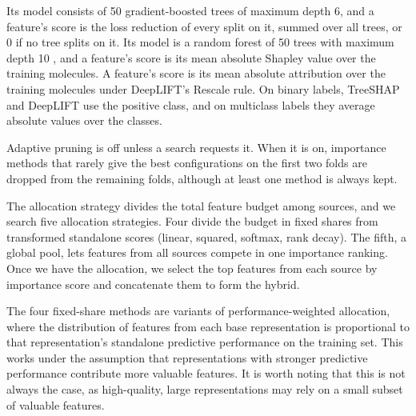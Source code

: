 Its model consists of 50 gradient-boosted trees of maximum depth 6, and a feature's score is the loss reduction of every split on it, summed over all trees, or 0 if no tree splits on it.
Its model is a random forest of 50 trees with maximum depth 10 \citep{Breiman2001}, and a feature's score is its mean absolute Shapley value over the training molecules.
A feature's score is its mean absolute attribution over the training molecules under DeepLIFT's Rescale rule.
On binary labels, TreeSHAP and DeepLIFT use the positive class, and on multiclass labels they average absolute values over the classes.

Adaptive pruning is off unless a search requests it. When it is on, importance methods that rarely give the best configurations on the first two folds are dropped from the remaining folds, although at least one method is always kept.

The allocation strategy divides the total feature budget among sources, and we search five allocation strategies. Four divide the budget in fixed shares from transformed standalone scores (linear, squared, softmax, rank decay). The fifth, a global pool, lets features from all sources compete in one importance ranking. Once we have the allocation, we select the top features from each source by importance score and concatenate them to form the hybrid.

The four fixed-share methods are variants of performance-weighted allocation, where the distribution of features from each base representation is proportional to that representation's standalone predictive performance on the training set. This works under the assumption that representations with stronger predictive performance contribute more valuable features. It is worth noting that this is not always the case, as high-quality, large representations may rely on a small subset of valuable features.

